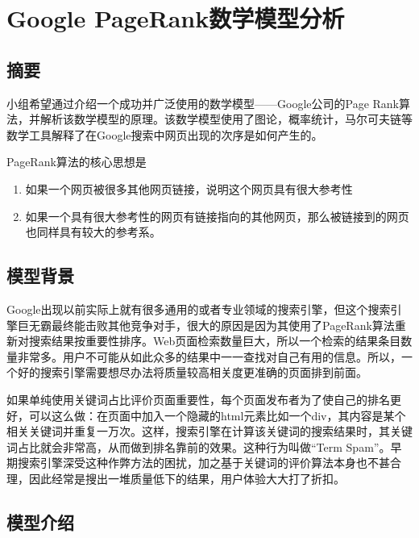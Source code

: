 \documentclass[UTF8
]{ctexart}
\date{}
\begin{document}
\hypertarget{header-n0}{%
\section{Google PageRank数学模型分析}\label{header-n0}}

\hypertarget{header-n2}{%
\subsection{摘要}\label{header-n2}}

小组希望通过介绍一个成功并广泛使用的数学模型------Google公司的Page
Rank算法，并解析该数学模型的原理。该数学模型使用了图论，概率统计，马尔可夫链等数学工具解释了在Google搜索中网页出现的次序是如何产生的。

PageRank算法的核心思想是

\begin{enumerate}
\def\labelenumi{\arabic{enumi}.}
\item
  如果一个网页被很多其他网页链接，说明这个网页具有很大参考性
\item
  如果一个具有很大参考性的网页有链接指向的其他网页，那么被链接到的网页也同样具有较大的参考系。
\end{enumerate}

\hypertarget{header-n9}{
\subsection{模型背景}\label{header-n9}}

Google出现以前实际上就有很多通用的或者专业领域的搜索引擎，但这个搜索引擎巨无霸最终能击败其他竞争对手，很大的原因是因为其使用了PageRank算法重新对搜索结果按重要性排序。Web页面检索数量巨大，所以一个检索的结果条目数量非常多。用户不可能从如此众多的结果中一一查找对自己有用的信息。所以，一个好的搜索引擎需要想尽办法将质量较高相关度更准确的页面排到前面。

如果单纯使用关键词占比评价页面重要性，每个页面发布者为了使自己的排名更好，可以这么做：在页面中加入一个隐藏的html元素比如一个div，其内容是某个相关关键词并重复一万次。这样，搜索引擎在计算该关键词的搜索结果时，其关键词占比就会非常高，从而做到排名靠前的效果。这种行为叫做“Term Spam”。早期搜索引擎深受这种作弊方法的困扰，加之基于关键词的评价算法本身也不甚合理，因此经常是搜出一堆质量低下的结果，用户体验大大打了折扣。

\hypertarget{header-n10}{%
\subsection{模型介绍}\label{header-n10}}
\end{document}
